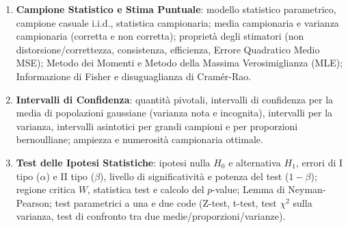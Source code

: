 \documentclass[11pt,a4paper,twoside,openright]{book}
\begin{document}
\begin{enumerate}
    \item \textbf{Campione Statistico e Stima Puntuale}: modello statistico parametrico, campione casuale i.i.d., statistica campionaria; media campionaria e varianza campionaria (corretta e non corretta); proprietà degli stimatori (non distorsione/correttezza, consistenza, efficienza, Errore Quadratico Medio MSE); Metodo dei Momenti e Metodo della Massima Verosimiglianza (MLE); Informazione di Fisher e disuguaglianza di Cramér-Rao.
    \item \textbf{Intervalli di Confidenza}: quantità pivotali, intervalli di confidenza per la media di popolazioni gaussiane (varianza nota e incognita), intervalli per la varianza, intervalli asintotici per grandi campioni e per proporzioni bernoulliane; ampiezza e numerosità campionaria ottimale.
    \item \textbf{Test delle Ipotesi Statistiche}: ipotesi nulla $H_0$ e alternativa $H_1$, errori di I tipo ($\alpha$) e II tipo ($\beta$), livello di significatività e potenza del test ($1-\beta$); regione critica $W$, statistica test e calcolo del $p$-value; Lemma di Neyman-Pearson; test parametrici a una e due code (Z-test, t-test, test $\chi^2$ sulla varianza, test di confronto tra due medie/proporzioni/varianze).
\end{enumerate}

\cleardoublepage

\mainmatter














\end{document}

